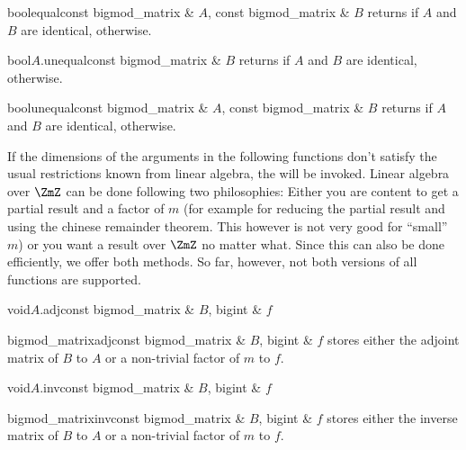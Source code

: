 \begin{fcode}{bool}{equal}{const bigmod_matrix & $A$, const bigmod_matrix & $B$}
  returns \TRUE if $A$ and $B$ are identical, \FALSE otherwise.
\end{fcode}

\begin{cfcode}{bool}{$A$.unequal}{const bigmod_matrix & $B$}
  returns \FALSE if $A$ and $B$ are identical, \TRUE otherwise.
\end{cfcode}

\begin{fcode}{bool}{unequal}{const bigmod_matrix & $A$, const bigmod_matrix & $B$}
  returns \FALSE if $A$ and $B$ are identical, \TRUE otherwise.
\end{fcode}




If the dimensions of the arguments in the following functions don't satisfy the usual
restrictions known from linear algebra, the \LEH will be invoked.  Linear algebra over $\ZmZ$ can
be done following two philosophies: Either you are content to get a partial result and a factor
of $m$ (for example for reducing the partial result and using the chinese remainder theorem.
This however is not very good for ``small'' $m$) or you want a result over $\ZmZ$ no
matter what.  Since this can also be done efficiently, we offer both methods.  So far, however,
not both versions of all functions are supported.

\begin{fcode}{void}{$A$.adj}{const bigmod_matrix & $B$, bigint & $f$}
\end{fcode}

\begin{fcode}{bigmod_matrix}{adj}{const bigmod_matrix & $B$, bigint & $f$}
  stores either the adjoint matrix of $B$ to $A$ or a non-trivial factor of $m$ to $f$.
\end{fcode}

\begin{fcode}{void}{$A$.inv}{const bigmod_matrix & $B$, bigint & $f$}
\end{fcode}

\begin{fcode}{bigmod_matrix}{inv}{const bigmod_matrix & $B$, bigint & $f$}
  stores either the inverse matrix of $B$ to $A$ or a non-trivial factor of $m$ to $f$.
\end{fcode}

